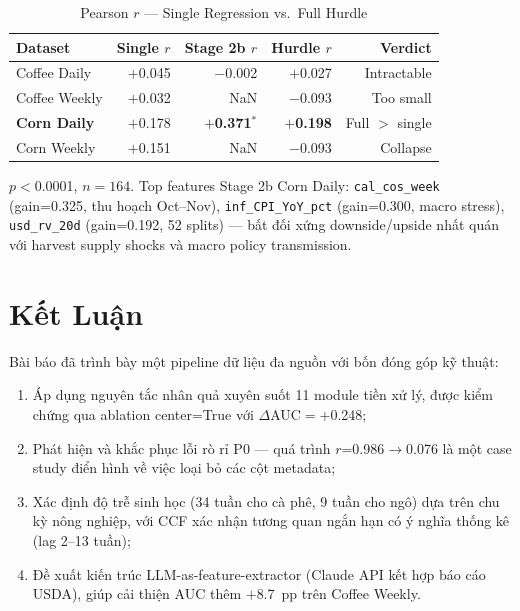\documentclass[conference]{IEEEtran}
\begin{document}
\begin{table}[t]
\caption{Pearson $r$ --- Single Regression vs.\ Full Hurdle}
\label{tab:hurdle}
\centering
\begin{tabular}{@{}lrrrr@{}}
\toprule
\textbf{Dataset} & \textbf{Single $r$} & \textbf{Stage 2b $r$} & \textbf{Hurdle $r$} & \textbf{Verdict} \\
\midrule
Coffee Daily  & $+$0.045 & $-$0.002 & $+$0.027 & Intractable \\
Coffee Weekly & $+$0.032 & NaN & $-$0.093 & Too small \\
\textbf{Corn Daily} & $+$0.178 & $+$\textbf{0.371}$^*$ & $+$\textbf{0.198} & Full $>$ single \\
Corn Weekly   & $+$0.151 & NaN & $-$0.093 & Collapse \\
\bottomrule
\end{tabular}
\begin{tablenotes}
\footnotesize
\item[*] $p<$0.0001, $n=164$. Top features Stage 2b Corn Daily:
\texttt{cal\_cos\_week} (gain=0.325, thu hoạch Oct--Nov),
\texttt{inf\_CPI\_YoY\_pct} (gain=0.300, macro stress),
\texttt{usd\_rv\_20d} (gain=0.192, 52 splits) ---
bất đối xứng downside/upside nhất quán với harvest supply shocks
và macro policy transmission.
\end{tablenotes}
\end{table}

\section{Kết Luận}

Bài báo đã trình bày một pipeline dữ liệu đa nguồn với bốn đóng góp kỹ thuật:

\begin{enumerate}
\item Áp dụng nguyên tắc nhân quả xuyên suốt 11 module tiền xử lý, được kiểm
  chứng qua ablation center=True với $\Delta$AUC$=$+0.248;
\item Phát hiện và khắc phục lỗi rò rỉ P0 --- quá trình $r$=0.986$\to$0.076 là
  một case study điển hình về việc loại bỏ các cột metadata;
\item Xác định độ trễ sinh học (34 tuần cho cà phê, 9 tuần cho ngô) dựa trên
  chu kỳ nông nghiệp, với CCF xác nhận tương quan ngắn hạn có ý nghĩa thống kê
  (lag 2--13 tuần);
\item Đề xuất kiến trúc LLM-as-feature-extractor (Claude API kết hợp báo cáo
  USDA), giúp cải thiện AUC thêm $+$8.7~pp trên Coffee Weekly.
\end{enumerate}
\end{document}

